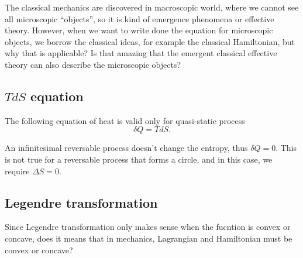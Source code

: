 \documentclass[10pt]{article}
\begin{document}
	The classical mechanics are discovered in macroscopic world, where we cannot see all microscopic ``objects'', so it is kind of emergence phenomena or effective theory. However, when we want to write done the equation for microscopic objects, we borrow the classical ideas, for example the classical Hamiltonian, but why that is applicable? Is that amazing that the emergent classical effective theory can also describe the microscopic objects?

	\subsection{$TdS$ equation}

	The following equation of heat is valid only for quasi-static process
	\begin{equation}
		\delta Q = TdS.
	\end{equation}

	An infinitesimal reversable process doesn't change the entropy, thus $\delta Q = 0$. This is not true for a reversable process that forms a circle, and in this case, we require $\Delta S = 0$.

	\subsection{Legendre transformation}

	Since Legendre transformation only makes sense when the fucntion is convex or concave, does it means that in mechanics, Lagrangian and Hamiltonian must be convex or concave?
\end{document}
